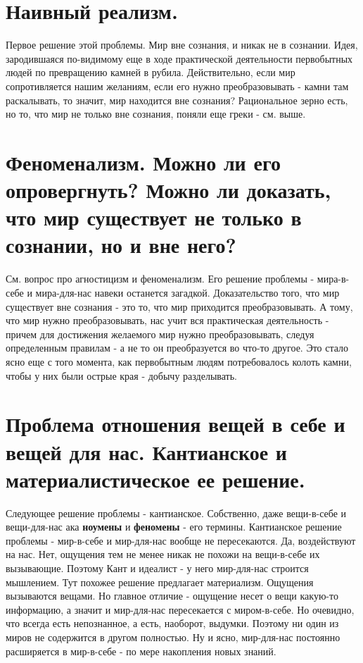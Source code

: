 \section{ Наивный реализм.}
Первое решение этой проблемы. Мир вне сознания, и никак не в сознании. Идея, зародившаяся по-видимому еще в ходе практической деятельности первобытных людей по превращению камней в рубила. Действительно, если мир сопротивляется нашим желаниям, если его нужно преобразовывать - камни там раскалывать, то значит, мир находится вне сознания? Рациональное зерно есть, но то, что мир не только вне сознания, поняли еще греки - см. выше.

\section{ Феноменализм. Можно ли его опровергнуть? Можно ли доказать, что мир существует не только в сознании, но и вне него?}
См. вопрос про агностицизм и феноменализм. Его решение проблемы - мира-в-себе и мира-для-нас навеки останется загадкой. Доказательство того, что мир существует вне сознания - это то, что мир приходится преобразовывать. А тому, что мир нужно преобразовывать, нас учит вся практическая деятельность - причем для достижения желаемого мир нужно преобразовывать, следуя определенным правилам - а не то он преобразуется во что-то другое. Это стало ясно еще с того момента, как первобытным людям потребовалось колоть камни, чтобы у них были острые края - добычу разделывать.

\section{ Проблема отношения вещей в себе и вещей для нас. Кантианское и материалистическое ее решение.}
Следующее решение проблемы - кантианское. Собственно, даже вещи-в-себе и вещи-для-нас ака \textbf{ноумены} и \textbf{феномены} - его термины. Кантианское решение проблемы - мир-в-себе и мир-для-нас вообще не пересекаются. Да, воздействуют на нас. Нет, ощущения тем не менее никак не похожи на вещи-в-себе их вызывающие. Поэтому Кант и идеалист - у него мир-для-нас строится мышлением. Тут похожее решение предлагает материализм. Ощущения вызываются вещами. Но главное отличие - ощущение несет о вещи какую-то информацию, а значит и мир-для-нас пересекается с миром-в-себе. Но очевидно, что всегда есть непознанное, а есть, наоборот, выдумки. Поэтому ни один из миров не содержится в другом полностью. Ну и ясно, мир-для-нас постоянно расширяется в мир-в-себе - по мере накопления новых знаний.

